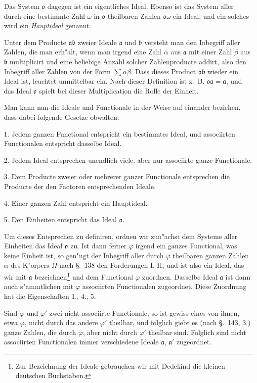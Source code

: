 \documentclass[12pt,a4paper]{article}
\theoremstyle{definition}
\begin{document}
Das System $\mathfrak{o}$ dagegen ist ein eigentliches Ideal. Ebenso ist das System aller durch eine bestimmte Zahl $\omega$ in $\mathfrak{o}$ theilbaren Zahlen $\mathfrak{o}\omega$ ein Ideal, und ein solches wird ein \emph{Hauptideal} genannt.

Unter dem Producte $\mathfrak{a}\mathfrak{b}$ zweier Ideale $\mathfrak{a}$ und $\mathfrak{b}$ versteht man den Inbegriff aller Zahlen, die man erh"alt, wenn man irgend eine Zahl $\alpha$ aus $\mathfrak{a}$ mit einer Zahl $\beta$ aus $\mathfrak{b}$ multiplicirt und eine beliebige Anzahl solcher Zahlenproducte addirt, also den Inbegriff aller Zahlen von der Form $\sum \alpha\beta$. Dass dieses Product $\mathfrak{a}\mathfrak{b}$ wieder ein Ideal ist, leuchtet unmittelbar ein. Nach dieser Definition ist z.~B. $\mathfrak{o}\mathfrak{a} = \mathfrak{a}$, und das Ideal $\mathfrak{o}$ spielt bei dieser Multiplication die Rolle der Einheit.

Man kann nun die Ideale und Functionale in der Weise auf einander beziehen, dass dabei folgende Gesetze obwalten:

1. Jedem ganzen Functional entspricht ein bestimmtes Ideal, und associirten Functionalen entspricht dasselbe Ideal.

2. Jedem Ideal entsprechen unendlich viele, aber nur associirte ganze Functionale.

3. Dem Producte zweier oder mehrerer ganzer Functionale entsprechen die Producte der den Factoren entsprechenden Ideale.

4. Einer ganzen Zahl entspricht ein Hauptideal.

5. Den Einheiten entspricht das Ideal $\mathfrak{o}$.

Um dieses Entsprechen zu definiren, ordnen wir zun"achst dem Systeme aller Einheiten das Ideal $\mathfrak{o}$ zu. Ist dann ferner $\varphi$ irgend ein ganzes Functional, was keine Einheit ist, so gen"ugt der Inbegriff aller durch $\varphi$ theilbaren ganzen Zahlen $\alpha$ des K"orpers $\Omega$ nach \S.~138 den Forderungen I, II, und ist also ein Ideal, das wir mit $\mathfrak{a}$ bezeichnen\footnote{Zur Bezeichnung der Ideale gebrauchen wir mit Dedekind die kleinen deutschen Buchstaben.} und dem Functional $\varphi$ zuordnen. Dasselbe Ideal $\mathfrak{a}$ ist dann auch s"ammtlichen mit $\varphi$ associirten Functionalen zugeordnet. Diese Zuordnung hat die Eigenschaften 1., 4., 5.

Sind $\varphi$ und $\varphi'$ zwei nicht associirte Functionale, so ist gewiss eines von ihnen, etwa $\varphi$, nicht durch das andere $\varphi'$ theilbar, und folglich giebt es (nach \S.~143, 3.) ganze Zahlen, die durch $\varphi$, aber nicht durch $\varphi'$ theilbar sind. Folglich sind nicht associirten Functionalen immer verschiedene Ideale $\mathfrak{a}$, $\mathfrak{a}'$ zugeordnet.
\end{document}
